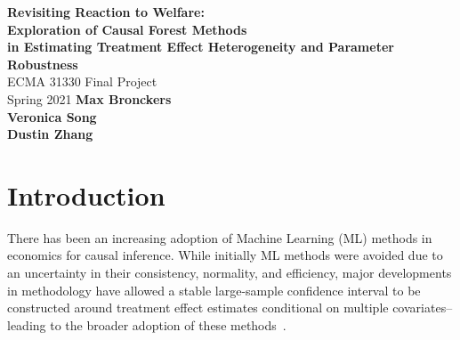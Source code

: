 \documentclass[12pt]{article}
\begin{document}
\begin{titlepage}
    \begin{center}
        \vspace*{1cm}
        \LARGE
        \textbf{Revisiting Reaction to Welfare:\\ Exploration of Causal Forest Methods\\ in Estimating Treatment Effect Heterogeneity and Parameter Robustness\\}
        \vspace{0.5cm}
        \Large
        ECMA 31330 Final Project \\ 
        \vspace{0.8cm}
        \large
        Spring 2021
        \vfill
        \vspace{5cm}
        \textbf{Max Bronckers \\ Veronica Song \\ Dustin Zhang}
    \end{center}
\end{titlepage}

\tableofcontents

\clearpage
\section{Introduction} 
There has been an increasing adoption of Machine Learning (ML) methods in
economics for causal inference. While initially ML methods were avoided due to
an uncertainty in their consistency, normality, and efficiency, major developments in
methodology have allowed a stable large-sample confidence interval to be
constructed around treatment effect estimates conditional on multiple
covariates--leading to the broader adoption of these methods~\cite{athey2019ML}. \\
\end{document}

